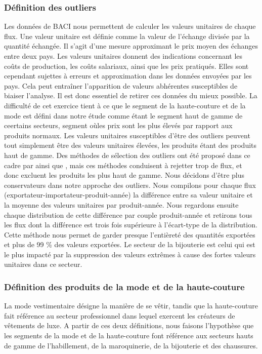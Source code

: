 \documentclass[french,10pt,a4paper]{article}
\begin{document}
\subsubsection{Définition des outliers}
Les données de BACI nous permettent de calculer les valeurs unitaires de chaque flux. Une valeur unitaire est définie comme la valeur de l'échange divisée par la quantité échangée. Il s'agit d'une mesure approximant le prix moyen des échanges entre deux pays. Les valeurs unitaires donnent des indications concernant les coûts de production, les coûts salariaux, ainsi que les prix pratiqués. Elles sont cependant sujettes à erreurs et approximation dans les données envoyées par les pays. Cela peut entraîner l'apparition de valeurs abhérentes susceptibles de biaiser l'analyse. Il est donc essentiel de retirer ces données du mieux possible.  La difficulté de cet exercice tient à ce que le segment de la haute-couture et de la mode est défini dans notre étude comme étant le segment haut de gamme de ceertains secteurs, segment oùles prix sont les plus élevés par rapport aux produits normaux. Les valeurs unitaires susceptibles d'être des outliers peuvent tout simplement être des valeurs unitaires élevées, les produits étant des produits haut de gamme. Des méthodes de sélection des outliers ont été proposé dans ce cadre par \cite{Hallak2006} ainsi que \cite{Fontagne2013}, mais ces méthodes conduisent à rejetter trop de flux, et donc excluent les produits les plus haut de gamme. Nous décidons d'être plus conservateurs dans notre approche des outliers. Nous compilons pour chaque flux (exportateur-importateur-produit-année) la différence entre sa valeur unitaire et la moyenne des valeurs unitaires par produit-année. Nous regardons ensuite chaque distribution de cette différence par couple produit-année et retirons tous les flux dont la différence est trois fois supérieure à l'écart-type de la distribution. Cette méthode nous permet de garder presque l'entièreté des quantités exportées et plus de 99 \% des valeurs exportées. Le secteur de la bijouterie est celui qui est le plus impacté par la suppression des valeurs extrêmes à cause des fortes valeurs unitaires dans ce secteur.

\subsubsection{Définition des produits de la mode et de la haute-couture}
La mode vestimentaire désigne la manière de se vêtir, tandis que la haute-couture fait référence au secteur professionnel dans lequel exercent les créateurs de vêtements de luxe. A partir de ces deux définitions, nous faisons l'hypothèse que les segments de la mode et de la haute-couture font référence aux secteurs hauts de gamme de l'habillement, de la maroquinerie, de la bijouterie et des chaussures.
\end{document}
